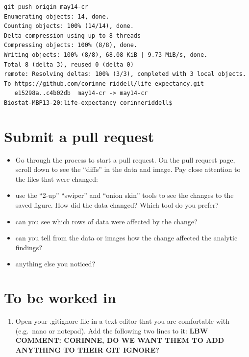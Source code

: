 \documentclass[
]{book}
\providecommand{\tightlist}{%
  \setlength{\itemsep}{0pt}\setlength{\parskip}{0pt}}
\begin{document}
\begin{verbatim}
git push origin may14-cr
Enumerating objects: 14, done.
Counting objects: 100% (14/14), done.
Delta compression using up to 8 threads
Compressing objects: 100% (8/8), done.
Writing objects: 100% (8/8), 68.08 KiB | 9.73 MiB/s, done.
Total 8 (delta 3), reused 0 (delta 0)
remote: Resolving deltas: 100% (3/3), completed with 3 local objects.
To https://github.com/corinne-riddell/life-expectancy.git
   e15298a..c4b02db  may14-cr -> may14-cr
Biostat-MBP13-20:life-expectancy corinneriddell$ 
\end{verbatim}

\hypertarget{submit-a-pull-request}{%
\section{Submit a pull request}\label{submit-a-pull-request}}

\begin{itemize}
\tightlist
\item
  Go through the process to start a pull request. On the pull request page,
  scroll down to see the ``diffs'' in the data and image. Pay close attention to
  the files that were changed:
\item
  use the ``2-up'' ``swiper'' and ``onion skin'' tools to see the changes to the saved figure.
  How did the data changed? Which tool do you prefer?
\item
  can you see which rows of data were affected by the change?
\item
  can you tell from the data or images how the change affected the analytic findings?
\item
  anything else you noticed?
\end{itemize}

\hypertarget{to-be-worked-in}{%
\section{To be worked in}\label{to-be-worked-in}}

\begin{enumerate}
\def\labelenumi{(\roman{enumi})}
\setcounter{enumi}{5}
\tightlist
\item
  Open your .gitignore file in a text editor that you are comfortable with (e.g.~nano or notepad). Add the following two lines to it: \textbf{LBW COMMENT: CORINNE, DO WE WANT THEM TO ADD ANYTHING TO THEIR GIT IGNORE?}
\end{enumerate}
\end{document}
